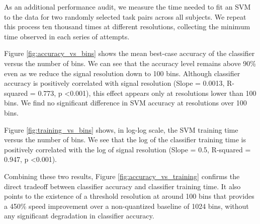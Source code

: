 As an additional performance audit, we measure the time needed to fit an SVM to the data for two randomly selected task pairs across all subjects. We repeat this process ten thousand times at different resolutions, collecting the minimum time observed in each series of attempts.


Figure \ref{fig:accuracy_vs_bins} shows the mean best-case accuracy of the classifier versus the number of bins. We can see that the accuracy level remains above 90\% even as we reduce the signal resolution down to 100 bins. Although classifier accuracy is positively correlated with signal resolution (Slope = 0.0013, R-squared = 0.773, p \textless 0.001), this effect appears only at resolutions lower than 100 bins. We find no significant difference in SVM accuracy at resolutions over 100 bins.



Figure \ref{fig:training_vs_bins} shows, in log-log scale, the SVM training time versus the number of bins. We see that the log of the classifier training time is positively correlated with the log of signal resolution (Slope = 0.5, R-squared = 0.947, p \textless 0.001). 

Combining these two results, Figure \ref{fig:accuracy_vs_training} confirms the direct tradeoff between classifier accuracy and classifier training time. It also points to the existence of a threshold resolution at around 100 bins that provides a 450\% speed improvement over a non-quantized baseline of 1024 bins, without any significant degradation in classifier accuracy.


